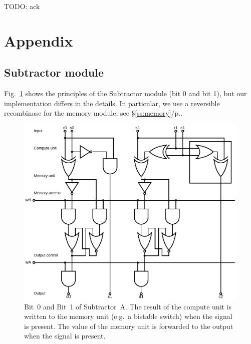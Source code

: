 \documentclass[12pt,notitlepage]{article}
\newcommand{\TODO}[1]{\textrm{\color{red}TODO: #1}}
\begin{document}
\TODO{ack}



\clearpage

\footnotesize


\normalsize

\clearpage


\section*{Appendix}

\subsection{Subtractor module}

Fig.~\ref{f:logical-subtractor01} 
shows the principles of
the Subtractor module (bit 0 and bit 1),
but our implementation
differs in the details.
%
In particular, we use a reversible recombinase
for the memory module, see \S\ref{ss:memory}/p.\pageref{ss:memory}.

\begin{figure}[phbt]
\centering
\includegraphics[width=0.9\linewidth]{circuits/Logical-HalfSubtractor0.svg.pdf}
%
\caption{%
Bit~0 and Bit~1
of
Subtractor~A.
%
The result of the compute unit is written to the memory unit
(e.g.~a bistable switch)
when the signal  is present.
%
The value of the memory unit is
forwarded to the output
when the signal  is present.
}
\label{f:logical-subtractor01}
\end{figure}
\end{document}
